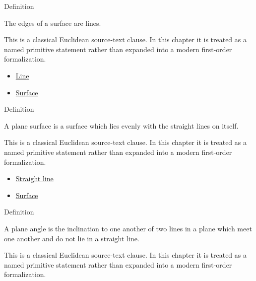\begin{definitionbox}{Definition}
\begin{definition}
\label{def:euclid-edges-of-a-surface}
The edges of a surface are lines.
\end{definition}
\end{definitionbox}
\begin{remark*}
This is a classical Euclidean source-text clause. In this chapter it is treated
as a named primitive statement rather than expanded into a modern first-order
formalization.
\end{remark*}

\begin{lra-not-visible}
\begin{dependencies}
\begin{itemize}
  \item \hyperref[def:euclid-line]{Line}
  \item \hyperref[def:euclid-surface]{Surface}
\end{itemize}
\end{dependencies}
\end{lra-not-visible}

\begin{definitionbox}{Definition}
\begin{definition}
\label{def:euclid-plane-surface}
A plane surface is a surface which lies evenly with the straight lines on itself.
\end{definition}
\end{definitionbox}
\begin{remark*}
This is a classical Euclidean source-text clause. In this chapter it is treated
as a named primitive statement rather than expanded into a modern first-order
formalization.
\end{remark*}

\begin{lra-not-visible}
\begin{dependencies}
\begin{itemize}
  \item \hyperref[def:euclid-straight-line]{Straight line}
  \item \hyperref[def:euclid-surface]{Surface}
\end{itemize}
\end{dependencies}
\end{lra-not-visible}

\begin{definitionbox}{Definition}
\begin{definition}
\label{def:euclid-plane-angle}
A plane angle is the inclination to one another of two lines in a plane which
meet one another and do not lie in a straight line.
\end{definition}
\end{definitionbox}
\begin{remark*}
This is a classical Euclidean source-text clause. In this chapter it is treated
as a named primitive statement rather than expanded into a modern first-order
formalization.
\end{remark*}

